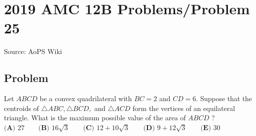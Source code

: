 \documentclass[12pt]{article}
\begin{document}
\section*{{2019 AMC 12B Problems/Problem 25}}
Source: AoPS Wiki

\subsection*{Problem}
Let $ABCD$ be a convex quadrilateral with $BC=2$ and $CD=6.$ Suppose that the centroids of $\triangle ABC,\triangle BCD,$ and $\triangle ACD$ form the vertices of an equilateral triangle. What is the maximum possible value of the area of $ABCD$ ? $\textbf{(A) } 27 \qquad\textbf{(B) } 16\sqrt3 \qquad\textbf{(C) } 12+10\sqrt3 \qquad\textbf{(D) } 9+12\sqrt3 \qquad\textbf{(E) } 30$
\end{document}

